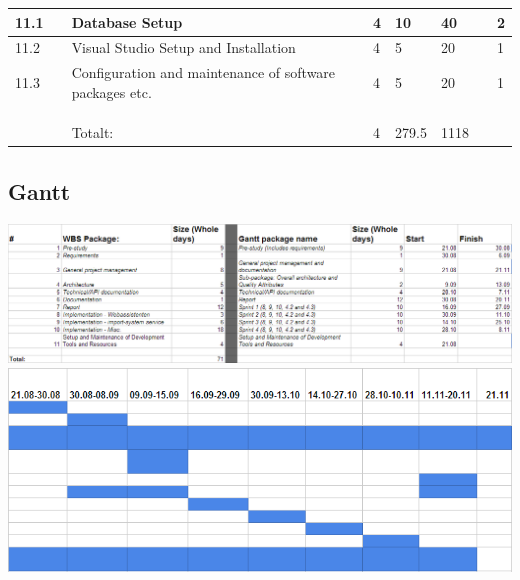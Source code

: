 \begin{longtable}{|p{0.7cm}|p{3cm}|p{2cm}|p{2cm}|p{2cm}|p{2cm}|p{2cm}|p{2cm}|}
\hline
11.1 &  & Database Setup & 4 & 10 & 40 &  & 2\\ 
\hline
11.2 &  & Visual Studio Setup and Installation & 4 & 5 & 20 &  & 1\\ 
\hline
11.3 &  & Configuration and maintenance of software packages etc. & 4 & 5 & 20 &  & 1\\ 
\hline
 &  &  &  &  &  &  & \\ 
\hline
 &  &  &  &  &  &  & \\ 
\hline
 &  &  &  &  &  &  & \\ 
\hline
 &  & Totalt: & 4 & 279.5 & 1118 &  & \\
\hline %

\end{longtable}
\subsection{Gantt}
\hspace{-1.7cm}\includegraphics[width=1.3\textwidth]{images/gantt01.png}\\

\includegraphics[width=1\textwidth]{images/gantt02.png}


